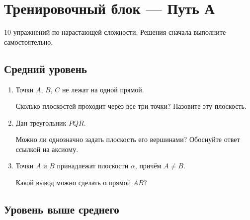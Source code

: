 \documentclass[a4paper,12pt]{article}
\begin{document}
\newpage

\section*{\textcolor{darkaccent}{Тренировочный блок --- Путь А}}

\textcolor{softgray}{
10 упражнений по нарастающей сложности. Решения сначала выполните самостоятельно.
}

\subsection*{\textcolor{accent}{Средний уровень}}

\begin{enumerate}
  \item
  Точки $A$, $B$, $C$ не лежат на одной прямой.

  Сколько плоскостей проходит через все три точки? Назовите эту плоскость.

  \item
  Дан треугольник $PQR$.

  Можно ли однозначно задать плоскость его вершинами? Обоснуйте ответ ссылкой на аксиому.

  \item
  Точки $A$ и $B$ принадлежат плоскости $\alpha$, причём $A\ne B$.

  Какой вывод можно сделать о прямой $AB$?
\end{enumerate}

\subsection*{\textcolor{accent}{Уровень выше среднего}}
\end{document}

